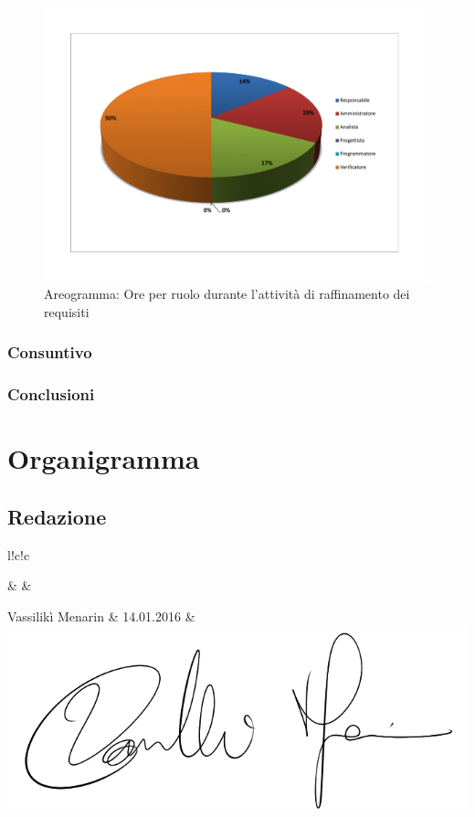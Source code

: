 \documentclass[a4paper, titlepage]{article}
\begin{document}
	\begin{figure}[!ht]
		\centering
		\includegraphics[scale=0.5]{Img/Grafici/Aer02.pdf}
		\caption{ Areogramma: Ore per ruolo durante l'attività di raffinamento dei requisiti}
	\end{figure}
	
	\subsubsection{Consuntivo}
	\subsubsection{Conclusioni}
	
	\newpage
	\section{Organigramma}
	
	\subsection{Redazione}
	
	\begin{tabella}{l!{\VRule}c!{\VRule}c}
		
		\color{white}  & \color{white}  &\color{white}  \\
		\endfirsthead
		
		Vassilikì Menarin & 14.01.2016 & \includegraphics[scale=0.15]{Img/Firme/Viki.png} \\
		
	\end{tabella}
	
\end{document}
